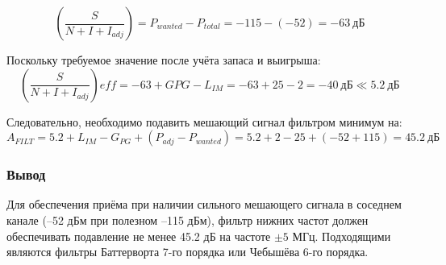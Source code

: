 \documentclass[a4paper,12pt]{article}
\begin{document}
\begin{equation}
\left( \frac{S}{N + I + I_{adj}} \right) = P_{wanted} - P_{total} = -115 - (-52) = -63\ \text{дБ}
\end{equation}

Поскольку требуемое значение после учёта запаса и выигрыша:
\begin{equation}
\left( \frac{S}{N + I + I_{adj}} \right){eff} = -63 + G{PG} - L_{IM} = -63 + 25 - 2 = -40\ \text{дБ} \ll 5.2\ \text{дБ}
\end{equation}

Следовательно, необходимо подавить мешающий сигнал фильтром минимум на:
\begin{equation}
A_{FILT} = 5.2 + L_{IM} - G_{PG} + (P_{adj} - P_{wanted}) = 5.2 + 2 - 25 + ( -52 + 115 ) = 45.2\ \text{дБ}
\end{equation}

\subsubsection{Вывод}
Для обеспечения приёма при наличии сильного мешающего сигнала в соседнем канале (–52 дБм при полезном –115 дБм), фильтр нижних частот должен обеспечивать подавление не менее 45.2 дБ на частоте $\pm 5$ МГц. Подходящими являются фильтры Баттерворта 7-го порядка или Чебышёва 6-го порядка.
\end{document}
